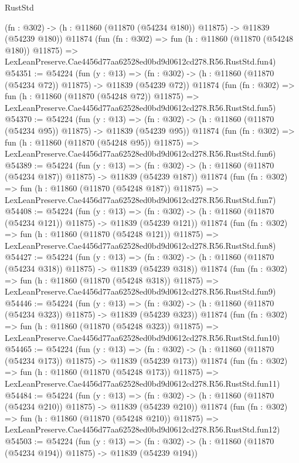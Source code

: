 \begin{lexlean}{RustStd}
\begin{coremodule}
    (fn : @302) -> (h : @11860 (@11870 (@54234 @180)) @11875) -> @11839 (@54239 @180))
    @11874
    (fun (fn : @302) =>
    fun (h : @11860 (@11870 (@54248 @180)) @11875) =>
    LexLeanPreserve.Cae4456d77aa62528ed0bd9d0612cd278.R56.RustStd.fun4)
@54351 := @54224
    (fun (y : @13) =>
    (fn : @302) -> (h : @11860 (@11870 (@54234 @72)) @11875) -> @11839 (@54239 @72))
    @11874
    (fun (fn : @302) =>
    fun (h : @11860 (@11870 (@54248 @72)) @11875) =>
    LexLeanPreserve.Cae4456d77aa62528ed0bd9d0612cd278.R56.RustStd.fun5)
@54370 := @54224
    (fun (y : @13) =>
    (fn : @302) -> (h : @11860 (@11870 (@54234 @95)) @11875) -> @11839 (@54239 @95))
    @11874
    (fun (fn : @302) =>
    fun (h : @11860 (@11870 (@54248 @95)) @11875) =>
    LexLeanPreserve.Cae4456d77aa62528ed0bd9d0612cd278.R56.RustStd.fun6)
@54389 := @54224
    (fun (y : @13) =>
    (fn : @302) -> (h : @11860 (@11870 (@54234 @187)) @11875) -> @11839 (@54239 @187))
    @11874
    (fun (fn : @302) =>
    fun (h : @11860 (@11870 (@54248 @187)) @11875) =>
    LexLeanPreserve.Cae4456d77aa62528ed0bd9d0612cd278.R56.RustStd.fun7)
@54408 := @54224
    (fun (y : @13) =>
    (fn : @302) -> (h : @11860 (@11870 (@54234 @121)) @11875) -> @11839 (@54239 @121))
    @11874
    (fun (fn : @302) =>
    fun (h : @11860 (@11870 (@54248 @121)) @11875) =>
    LexLeanPreserve.Cae4456d77aa62528ed0bd9d0612cd278.R56.RustStd.fun8)
@54427 := @54224
    (fun (y : @13) =>
    (fn : @302) -> (h : @11860 (@11870 (@54234 @318)) @11875) -> @11839 (@54239 @318))
    @11874
    (fun (fn : @302) =>
    fun (h : @11860 (@11870 (@54248 @318)) @11875) =>
    LexLeanPreserve.Cae4456d77aa62528ed0bd9d0612cd278.R56.RustStd.fun9)
@54446 := @54224
    (fun (y : @13) =>
    (fn : @302) -> (h : @11860 (@11870 (@54234 @323)) @11875) -> @11839 (@54239 @323))
    @11874
    (fun (fn : @302) =>
    fun (h : @11860 (@11870 (@54248 @323)) @11875) =>
    LexLeanPreserve.Cae4456d77aa62528ed0bd9d0612cd278.R56.RustStd.fun10)
@54465 := @54224
    (fun (y : @13) =>
    (fn : @302) -> (h : @11860 (@11870 (@54234 @173)) @11875) -> @11839 (@54239 @173))
    @11874
    (fun (fn : @302) =>
    fun (h : @11860 (@11870 (@54248 @173)) @11875) =>
    LexLeanPreserve.Cae4456d77aa62528ed0bd9d0612cd278.R56.RustStd.fun11)
@54484 := @54224
    (fun (y : @13) =>
    (fn : @302) -> (h : @11860 (@11870 (@54234 @210)) @11875) -> @11839 (@54239 @210))
    @11874
    (fun (fn : @302) =>
    fun (h : @11860 (@11870 (@54248 @210)) @11875) =>
    LexLeanPreserve.Cae4456d77aa62528ed0bd9d0612cd278.R56.RustStd.fun12)
@54503 := @54224
    (fun (y : @13) =>
    (fn : @302) -> (h : @11860 (@11870 (@54234 @194)) @11875) -> @11839 (@54239 @194))

\end{coremodule}
\end{lexlean}
